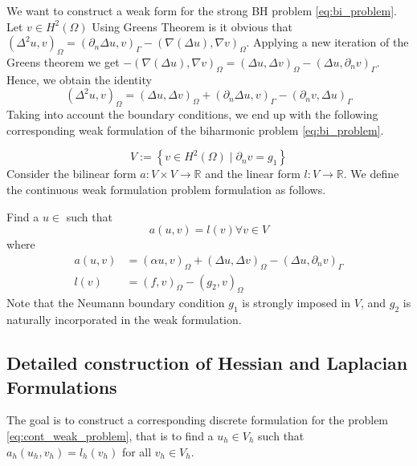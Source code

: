We want to construct a weak form for the strong BH problem \eqref{eq:bi_problem}. Let $v \in H^{2}( \Omega ) $  Using Greens Theorem is it obvious that \(
\left( \Delta ^2 u,v \right) _{ \Omega  }   = ( \partial _{n} \Delta u, v ) _{\Gamma   } - ( \nabla \left( \Delta  u \right) , \nabla v ) _{ \Omega }
\).
Applying a new iteration of the Greens theorem we get
$ -( \nabla ( \Delta u ) , \nabla v ) _{\Omega  }  =   ( \Delta u, \Delta v ) _{\Omega } - ( \Delta u, \partial _{n}v )_{\Gamma } $.
Hence, we obtain the identity
\begin{equation}
\label{eq:iden_bi}
( \Delta ^2 u, v ) _{\Omega } = ( \Delta u, \Delta v)_{\Omega } +  ( \partial _{n} \Delta u, v)_{\Gamma } - ( \partial _{n} v, \Delta u) _{\Gamma }
\end{equation}
Taking into account the boundary conditions, we end up with the following corresponding weak formulation of the biharmonic problem \eqref{eq:bi_problem}.

\begin{equation}
\label{eq:V_deg}
V := \left\{ v \in  H^2( \Omega )  \mid \partial _{n} v  = g_{1}   \right\}
\end{equation}
Consider the bilinear form $a:V\times V \to \mathbb{R}$ and the linear form $l: V \to \mathbb{R}$. We define the continuous weak formulation problem formulation as follows.

Find a $u \in   $ such that
\begin{equation}
\label{eq:cont_weak_problem}
a( u,v) = l( v)  \forall v \in V
\end{equation}
where
\begin{equation}
    \begin{split}
a( u,v) & =  ( \alpha u,v)_{\Omega } + ( \Delta u, \Delta v)_{\Omega } - (  \Delta u, \partial _{n} v) _{\Gamma }\\
l( v)  &= ( f,v)_{\Omega } - ( g_{2} , v)_\Omega
    \end{split}
\end{equation}
Note that the Neumann boundary condition $g_{1}$ is strongly imposed in $V$, and $g_{2}$ is naturally incorporated in the weak formulation.


\subsection{Detailed construction of Hessian and Laplacian Formulations }%
\label{sub:construction_of_laplacian_cip}
The goal is to construct a corresponding discrete formulation for the problem \eqref{eq:cont_weak_problem}, that is to find a $u_{h} \in V_{h}$ such that $a_{h}( u_{h}, v_{h}) = l_{h}( v_{h}) $ for all $v_{h} \in V_{h}$.

